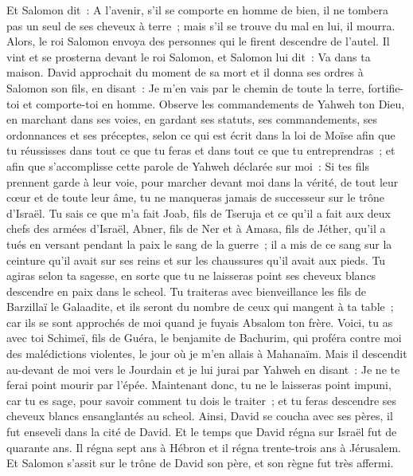 \begin{multicols}{2}
Et Salomon dit~: A l'avenir, s'il se comporte en homme de bien, il ne tombera pas un seul de ses cheveux à terre~; mais s'il se trouve du mal en lui, il mourra.
Alors, le roi Salomon envoya des personnes qui le firent descendre de l'autel. Il vint et se prosterna devant le roi Salomon, et Salomon lui dit~: Va dans ta maison.
\VerseOne{}David approchait du moment de sa mort et il donna ses ordres à Salomon son fils, en disant~:
Je m'en vais par le chemin de toute la terre, fortifie-toi et comporte-toi en homme.
Observe les commandements de Yahweh ton Dieu, en marchant dans ses voies, en gardant ses statuts, ses commandements, ses ordonnances et ses préceptes, selon ce qui est écrit dans la loi de Moïse afin que tu réussisses dans tout ce que tu feras et dans tout ce que tu entreprendras~;
et afin que s'accomplisse cette parole de Yahweh déclarée sur moi~: Si tes fils prennent garde à leur voie, pour marcher devant moi dans la vérité, de tout leur cœur et de toute leur âme, tu ne manqueras jamais de successeur sur le trône d'Israël.
Tu sais ce que m'a fait Joab, fils de Tseruja et ce qu'il a fait aux deux chefs des armées d'Israël, Abner, fils de Ner et à Amasa, fils de Jéther, qu'il a tués en versant pendant la paix le sang de la guerre~; il a mis de ce sang sur la ceinture qu'il avait sur ses reins et sur les chaussures qu'il avait aux pieds.
Tu agiras selon ta sagesse, en sorte que tu ne laisseras point ses cheveux blancs descendre en paix dans le scheol.
Tu traiteras avec bienveillance les fils de Barzillaï le Galaadite, et ils seront du nombre de ceux qui mangent à ta table~; car ils se sont approchés de moi quand je fuyais Absalom ton frère.
Voici, tu as avec toi Schimeï, fils de Guéra, le benjamite de Bachurim, qui proféra contre moi des malédictions violentes, le jour où je m'en allais à Mahanaïm. Mais il descendit au-devant de moi vers le Jourdain et je lui jurai par Yahweh en disant~: Je ne te ferai point mourir par l'épée.
Maintenant donc, tu ne le laisseras point impuni, car tu es sage, pour savoir comment tu dois le traiter~; et tu feras descendre ses cheveux blancs ensanglantés au scheol.
Ainsi, David se coucha avec ses pères, il fut enseveli dans la cité de David.
Et le temps que David régna sur Israël fut de quarante ans. Il régna sept ans à Hébron et il régna trente-trois ans à Jérusalem.
Et Salomon s'assit sur le trône de David son père, et son règne fut très affermi.

\end{multicols}
